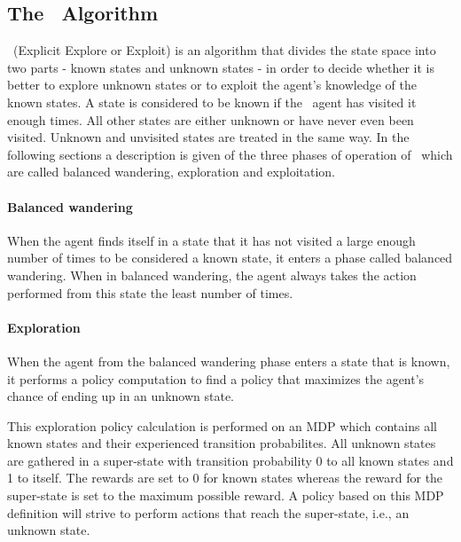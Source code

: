 \subsection{The \etre\ Algorithm }
\label{sec:e3}

\etre\ (Explicit Explore or Exploit) is an algorithm that divides the state space into two parts - known states and unknown states - in order to decide whether it is better to explore unknown states or to exploit the agent's knowledge of the known states. A state is considered to be known if the \etre\ agent has visited it enough times. All other states are either unknown or have never even been visited. Unknown and unvisited states are treated in the same way. In the following sections a description is given of the three phases of operation of \etre\, which are called balanced wandering, exploration and exploitation.  \parencite{kearns2002near}

 

\paragraph{Balanced wandering}

When the agent finds itself in a state that it has not visited a large enough number of times to be considered a known state, it enters a phase called balanced wandering. When in balanced wandering, the agent always takes the action performed from this state the least number of times. 


\paragraph{Exploration}
When the agent from the balanced wandering phase enters a state that is known, it performs a policy computation to find a policy that maximizes the agent's chance of ending up in an unknown state. 

This exploration policy calculation is performed on an MDP which contains all known states and their experienced transition probabilites. 
All unknown states are gathered in a super-state with transition probability 0 to all known states and 1 to itself. The rewards are set to 0 for known states whereas the reward for the super-state is set to the maximum possible reward. A policy based on this MDP definition will strive to perform actions that reach the super-state, i.e., an unknown state.

